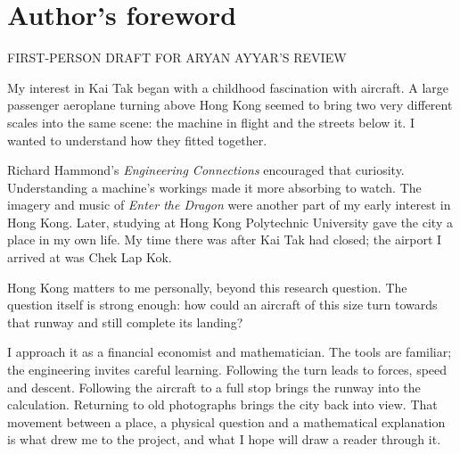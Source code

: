 \section*{Author's foreword}
{\small\sffamily\color{copper}FIRST-PERSON DRAFT FOR ARYAN AYYAR'S REVIEW}\par\medskip
My interest in Kai Tak began with a childhood fascination with aircraft. A large passenger aeroplane turning above Hong Kong seemed to bring two very different scales into the same scene: the machine in flight and the streets below it. I wanted to understand how they fitted together.

Richard Hammond's \emph{Engineering Connections} encouraged that curiosity. Understanding a machine's workings made it more absorbing to watch. The imagery and music of \emph{Enter the Dragon} were another part of my early interest in Hong Kong. Later, studying at Hong Kong Polytechnic University gave the city a place in my own life. My time there was after Kai Tak had closed; the airport I arrived at was Chek Lap Kok.

Hong Kong matters to me personally, beyond this research question. The question itself is strong enough: how could an aircraft of this size turn towards that runway and still complete its landing?

I approach it as a financial economist and mathematician. The tools are familiar; the engineering invites careful learning. Following the turn leads to forces, speed and descent. Following the aircraft to a full stop brings the runway into the calculation. Returning to old photographs brings the city back into view. That movement between a place, a physical question and a mathematical explanation is what drew me to the project, and what I hope will draw a reader through it.
